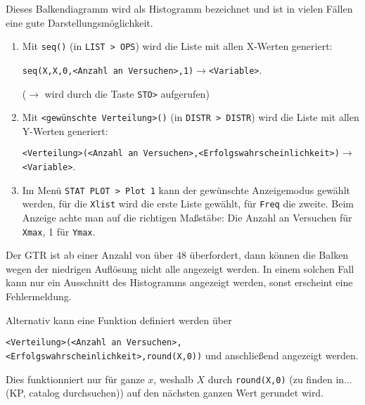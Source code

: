 \documentclass[main.tex]{subfiles}
\begin{document}
\begin{center}
\end{center}

\begin{Bemerkung}
  Dieses Balkendiagramm wird als Histogramm bezeichnet und ist in vielen Fällen eine gute Darstellungsmöglichkeit.
\end{Bemerkung}

\begin{GTR-Tipp}
  \begin{enumerate}
    \item Mit \texttt{seq()} (in \texttt{LIST > OPS}) wird die Liste mit allen X-Werten generiert:
    
    \texttt{seq(X,X,0,<Anzahl an Versuchen>,1)}$\rightarrow$\texttt{<Variable>}.

    ($\rightarrow$ wird durch die Taste \texttt{STO>} aufgerufen)
    \item Mit \texttt{<gewünschte Verteilung>()} (in \texttt{DISTR > DISTR}) wird die Liste mit allen Y-Werten generiert:
    
    \texttt{<Verteilung>(<Anzahl an Versuchen>,<Erfolgswahrscheinlichkeit>)}$\rightarrow$\texttt{<Variable>}.
    \item Im Menü \texttt{STAT PLOT > Plot 1} kann der gewünschte Anzeigemodus gewählt werden, für die \texttt{Xlist} wird die erste Liste gewählt, für \texttt{Freq} die zweite. Beim Anzeige achte man auf die richtigen Maßstäbe: Die Anzahl an Versuchen für \texttt{Xmax}, 1 für \texttt{Ymax}.
  \end{enumerate}

  \begin{Bemerkung}
    Der GTR ist ab einer Anzahl von über 48 überfordert, dann können die Balken wegen der niedrigen Auflösung nicht alle angezeigt werden. In einem solchen Fall kann nur ein Ausschnitt des Histogramms angezeigt werden, sonst erscheint eine Fehlermeldung.
  \end{Bemerkung}

  \begin{Bemerkung}
    Alternativ kann eine Funktion definiert werden über
    
    \texttt{<Verteilung>(<Anzahl an Versuchen>,<Erfolgswahrscheinlichkeit>,round(X,0))} und anschließend angezeigt werden.

    Dies funktionniert nur für ganze $x$, weshalb $X$ durch \texttt{round(X,0)} (zu finden in... (KP, catalog durchsuchen)) auf den nächsten ganzen Wert gerundet wird.
  \end{Bemerkung}
\end{GTR-Tipp}
\end{document}
